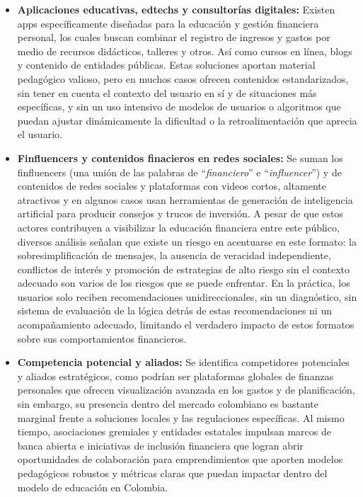 \begin{itemize}
	\item \textbf{Aplicaciones educativas, edtechs y consultorías digitales:} Existen apps específicamente diseñadas para la educación y gestión financiera personal, los cuales buscan combinar el registro de ingresos y gastos por medio de recursos didácticos, talleres y otros. Así como cursos en línea, blogs y contenido de entidades públicas. Estas soluciones aportan material pedagógico valioso, pero en muchos casos ofrecen contenidos estandarizados, sin tener en cuenta el contexto del usuario en sí y de situaciones más específicas, y sin un uso intensivo de modelos de usuarios o algoritmos que puedan ajustar dinámicamente la dificultad o la retroalimentación que aprecia el usuario.
	
	\item \textbf{Finfluencers y contenidos finacieros en redes sociales:} Se suman los finfluencers (una unión de las palabras de ``\textit{financiero}'' e ``\textit{influencer}'') y de contenidos de redes sociales y plataformas con videos cortos, altamente atractivos y en algunos casos usan herramientas de generación de inteligencia artificial para producir consejos y trucos de inversión. A pesar de que estos actores contribuyen a visibilizar la educación financiera entre este público, diversos análisis señalan que existe un riesgo en acentuarse en este formato: la sobresimplificación de mensajes, la ausencia de veracidad independiente, conflictos de interés y promoción de estrategias de alto riesgo sin el contexto adecuado son varios de los riesgos que se puede enfrentar. En la práctica, los usuarios solo reciben recomendaciones unidireccionales, sin un diagnóstico, sin sistema de evaluación de la lógica detrás de estas recomendaciones ni un acompañamiento adecuado, limitando el verdadero impacto de estos formatos sobre sus comportamientos financieros.
	
	\item \textbf{Competencia potencial y aliados:} Se identifica competidores potenciales y aliados estratégicos, como podrían ser plataformas globales de finanzas personales que ofrecen visualización avanzada en los gastos y de planificación, sin embargo, su presencia dentro del mercado colombiano es bastante marginal frente a soluciones locales y las regulaciones específicas. Al mismo tiempo, asociaciones gremiales y entidades estatales impulsan marcos de banca abierta e iniciativas de inclusión financiera que logran abrir oportunidades de colaboración para emprendimientos que aporten modelos pedagógicos robustos y métricas claras que puedan impactar dentro del modelo de educación en Colombia.
\end{itemize}

